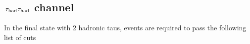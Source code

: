 \subsection{\texorpdfstring{$\,\tau_{\rm had}\tau_{\rm had}$ channel}{tau-tau channel}}
\label{sect:tauTauCuts}
In the final state with 2 hadronic taus, events are required to pass the following list of cuts
